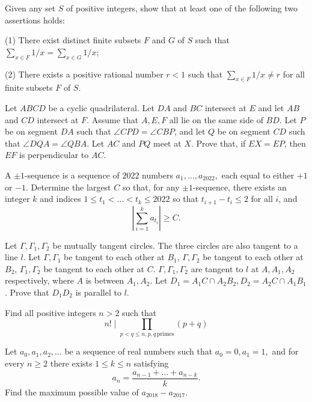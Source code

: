 \documentclass[11pt]{scrartcl}
\begin{document}
\begin{problem}[120381541018683]
Given any set $S$ of positive integers, show that at least one of the following two assertions holds:

(1) There exist distinct finite subsets $F$ and $G$ of $S$ such that $\sum_{x\in F}1/x=\sum_{x\in G}1/x$;

(2) There exists a positive rational number $r<1$ such that $\sum_{x\in F}1/x\neq r$ for all finite subsets $F$ of $S$.
\end{problem}
\begin{problem}[3353450172272500341]
Let $ABCD$ be a cyclic quadrilateral. Let $DA$ and $BC$ intersect at $E$ and let $AB$ and $CD$
intersect at $F$. Assume that $A, E, F$ all lie on the same side of $BD$. Let $P$ be on segment $DA$
such that $\angle CPD = \angle CBP$, and let $Q$ be on segment $CD$ such that $\angle DQA = \angle QBA$. Let $AC$ and $PQ$ meet at $X$. Prove that, if $EX = EP$, then $EF$ is perpendicular to $AC$.
\end{problem}
\begin{problem}[7948249970111159954]
	A $\pm 1$-sequence is a sequence of $2022$ numbers $a_1, \ldots, a_{2022},$ each equal to either $+1$ or $-1$. Determine the largest $C$ so that, for any $\pm 1$-sequence, there exists an integer $k$ and indices $1 \le t_1 < \ldots < t_k \le 2022$ so that $t_{i+1} - t_i \le 2$ for all $i$, and$$\left| \sum_{i = 1}^{k} a_{t_i} \right| \ge C.$$
\end{problem}
\begin{problem}[1121095467606378762]
	Let $\Gamma, \Gamma_1, \Gamma_2$ be mutually tangent circles. The three circles are also tangent to a line $l$. Let $\Gamma, \Gamma_1$ be tangent to each other at $B_1$, $\Gamma, \Gamma_2$ be tangent to each other at $B_2$, $\Gamma_1, \Gamma_2$ be tangent to each other at $C$. $\Gamma, \Gamma_1, \Gamma_2$ are tangent to $l$ at $A, A_1, A_2$ respectively, where $A$ is between $A_1,A_2$. Let $D_1 = A_1C \cap A_2B_2, D_2 = A_2C \cap A_1B_1$. Prove that $D_1D_2$ is parallel to $l$.
\end{problem}
\begin{problem}[6919176010062551987]
Find all positive integers $n>2$ such that
$$ n! \mid \prod_{ p<q\le n, p,q \, \text{primes}} (p+q)$$
\end{problem}
\begin{problem}[3923745101517032298]
	Let $a_0,a_1,a_2,\dots $ be a sequence of real numbers such that $a_0=0, a_1=1,$ and for every $n\geq 2$ there exists $1 \leq k \leq n$ satisfying\[ a_n=\frac{a_{n-1}+\dots + a_{n-k}}{k}. \]Find the maximum possible value of $a_{2018}-a_{2017}$.
\end{problem}
\end{document}
